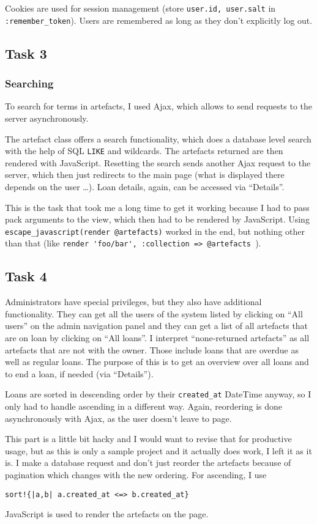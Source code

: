 \documentclass[fontsize=12pt,paper=a4]{scrartcl}
\begin{document}
Cookies are used for session management (store \verb|user.id, user.salt| in \verb|:remember_token|). Users are remembered as long as they don't explicitly log out. 

\subsection{Task 3}
\subsubsection{Searching}
To search for terms in artefacts, I used Ajax, which allows to send requests to the server asynchronously. 

The artefact class offers a search functionality, which does a database level search with the help of SQL \verb|LIKE| and wildcards. The artefacts returned are then rendered with JavaScript. Resetting the search sends another Ajax request to the server, which then just redirects to the main page (what is displayed there depends on the user \dots). Loan details, again, can be accessed via ``Details''.

This is the task that took me a long time to get it working because I had to pass pack arguments to the view, which then had to be rendered by JavaScript. Using \verb|escape_javascript(render @artefacts)| worked in the end, but nothing other than that (like \verb|render 'foo/bar', :collection => @artefacts |).

\subsection{Task 4}
Administrators have special privileges, but they also have additional functionality. They can get all the users of the system listed by clicking on ``All users'' on the admin navigation panel and they can get a list of all artefacts that are on loan by clicking on ``All loans''. I interpret ``none-returned artefacts'' as all artefacts that are not with the owner. Those include loans that are overdue as well as regular loans. The purpose of this is to get an overview over all loans and to end a loan, if needed (via ``Details'').

Loans are sorted in descending order by their \verb|created_at| DateTime anyway, so I only had to handle ascending in a different way. Again, reordering is done asynchronously with Ajax, as the user doesn't leave to page. 

This part is a little bit hacky and I would want to revise that for productive usage, but as this is only a sample project and it actually does work, I left it as it is. I make a database request and don't just reorder the artefacts because of pagination which changes with the new ordering. For ascending, I use \begin{verbatim}
sort!{|a,b| a.created_at <=> b.created_at}
\end{verbatim}
JavaScript is used to render the artefacts on the page.
\end{document}
